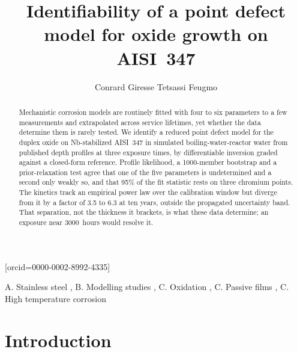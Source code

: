 \documentclass[a4paper,fleqn]{cas-sc}
\begin{document}
\let\WriteBookmarks\relax
\def\floatpagepagefraction{1}
\def\textpagefraction{.001}


\title[mode=title]{Identifiability of a point defect model for oxide growth on AISI~347}

\author[1]{Conrard Giresse Tetsassi Feugmo}[orcid=0000-0002-8992-4335]
\cormark[1]

\address[1]{Department of Chemistry and Department of Physics \& Astronomy,
            University of Waterloo, 200 University Avenue West,
            Waterloo, ON N2L 3G1, Canada}


\begin{abstract}
Mechanistic corrosion models are routinely fitted with four to
six parameters to a few measurements and extrapolated across service
lifetimes, yet whether the data determine them is rarely tested. We
identify a reduced point defect model for the duplex oxide on
Nb-stabilized AISI~347 in simulated
boiling-water-reactor water from published depth profiles at three
exposure times, by differentiable inversion graded against a
closed-form reference. Profile likelihood, a 1000-member bootstrap and
a prior-relaxation test agree that one of the five parameters is
undetermined and a second only weakly so, and that 95\% of the fit
statistic rests on three chromium points. The kinetics track an
empirical power law over the calibration window but diverge from it by
a factor of 3.5 to 6.3 at ten years, outside the propagated uncertainty
band. That separation, not the thickness it brackets, is what these
data determine; an exposure near 3000~hours would resolve it.
\end{abstract}

\begin{keywords}
A. Stainless steel \sep
B. Modelling studies \sep
C. Oxidation \sep
C. Passive films \sep
C. High temperature corrosion
\end{keywords}

\maketitle

\section{Introduction}\label{sec:intro}
\end{document}
